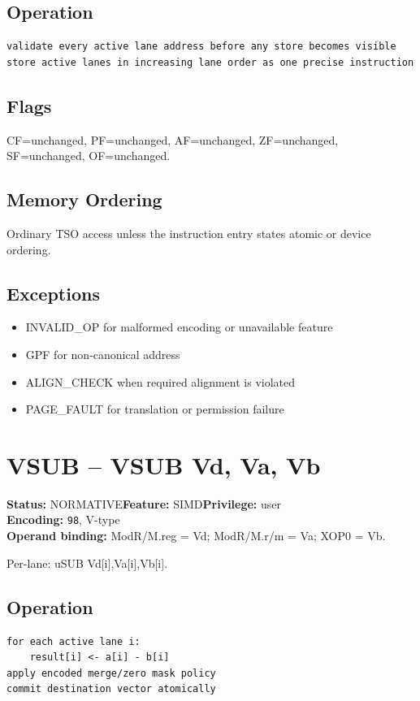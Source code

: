 \documentclass[10pt]{article}
\begin{document}
\subsection*{Operation}
\begin{lstlisting}
validate every active lane address before any store becomes visible
store active lanes in increasing lane order as one precise instruction
\end{lstlisting}
\subsection*{Flags}
CF=unchanged, PF=unchanged, AF=unchanged, ZF=unchanged, SF=unchanged, OF=unchanged.
\subsection*{Memory Ordering}
Ordinary TSO access unless the instruction entry states atomic or device ordering.
\subsection*{Exceptions}
\begin{itemize}
\item INVALID\_OP for malformed encoding or unavailable feature
\item GPF for non-canonical address
\item ALIGN\_CHECK when required alignment is violated
\item PAGE\_FAULT for translation or permission failure
\end{itemize}
\clearpage

\section{VSUB -- VSUB Vd, Va, Vb}
\textbf{Status:} NORMATIVE\quad \textbf{Feature:} SIMD\quad \textbf{Privilege:} user\\
\textbf{Encoding:} \texttt{98}, V-type\\
\textbf{Operand binding:} ModR/M.reg = Vd; ModR/M.r/m = Va; XOP0 = Vb.

Per-lane: uSUB Vd[i],Va[i],Vb[i].

\subsection*{Operation}
\begin{lstlisting}
for each active lane i:
    result[i] <- a[i] - b[i]
apply encoded merge/zero mask policy
commit destination vector atomically
\end{lstlisting}
\end{document}

